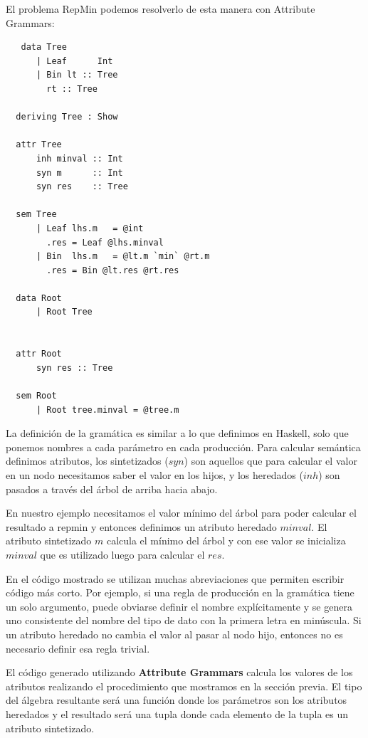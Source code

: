 \documentclass[a4paper,10pt]{article}
\begin{document}
  El problema RepMin podemos resolverlo de esta manera con Attribute Grammars:
  
  \begin{lstlisting}
   data Tree
      | Leaf      Int
      | Bin lt :: Tree
	    rt :: Tree

  deriving Tree : Show
	  
  attr Tree
      inh minval :: Int
      syn m      :: Int
      syn res    :: Tree
      
  sem Tree
      | Leaf lhs.m   = @int
		.res = Leaf @lhs.minval
      | Bin  lhs.m   = @lt.m `min` @rt.m
		.res = Bin @lt.res @rt.res
		
  data Root
      | Root Tree
      
      
  attr Root
      syn res :: Tree
      
  sem Root
      | Root tree.minval = @tree.m
  \end{lstlisting}

  La definición de la gramática es similar a lo que definimos en Haskell, solo que ponemos nombres
  a cada parámetro en cada producción. Para calcular semántica definimos atributos, los sintetizados ($syn$)
  son aquellos que para calcular el valor en un nodo necesitamos saber el valor en los hijos, y los heredados ($inh$)
  son pasados a través del árbol de arriba hacia abajo.
  
  En nuestro ejemplo necesitamos el valor mínimo del árbol para poder calcular el resultado a repmin y entonces definimos
  un atributo heredado $minval$. El atributo sintetizado $m$ calcula el mínimo del árbol y con ese valor se inicializa
  $minval$ que es utilizado luego para calcular el $res$.
  
  En el código mostrado se utilizan muchas abreviaciones que permiten escribir código más corto. Por ejemplo, si una regla
  de producción en la gramática tiene un solo argumento, puede obviarse definir el nombre explícitamente y se genera uno
  consistente del nombre del tipo de dato con la primera letra en minúscula. Si un atributo heredado no cambia el valor
  al pasar al nodo hijo, entonces no es necesario definir esa regla trivial.
  
  El código generado utilizando \textbf{Attribute Grammars} calcula los valores de los atributos realizando el procedimiento
  que mostramos en la sección previa. El tipo del álgebra resultante será una función donde los parámetros son los atributos
  heredados y el resultado será una tupla donde cada elemento de la tupla es un atributo sintetizado.
  
\end{document}
